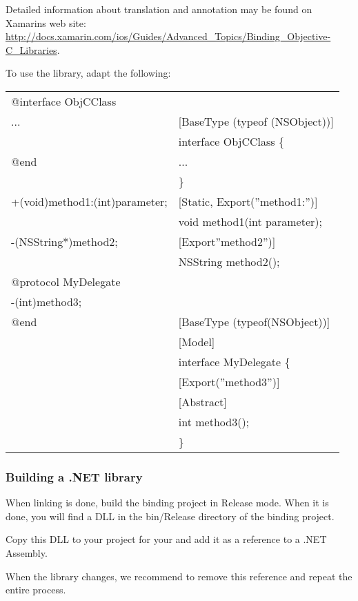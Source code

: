 Detailed information about translation and annotation may be found on Xamarins web site: 
\url{http://docs.xamarin.com/ios/Guides/Advanced\_Topics/Binding\_Objective-C\_Libraries}.

To use the library, adapt the following:

\begin{supertabular}{|p{6.0cm}p{6.0cm}|}
\hline
      @interface ObjCClass\\... 
      & [BaseType (typeof (NSObject))] \\ 
      & interface ObjCClass \{ \\
\hline
      @end & ... \\ 
      & \}\\
\hline
      +(void)method1:(int)parameter; 
      & [Static, Export(''method1:'')] \\ 
     & void method1(int parameter);\\
\hline
      -(NSString$\ast$)method2; 
      & [Export''method2'')] \\ 
      & NSString method2();\\
\hline
      @protocol MyDelegate \\
      -(int)method3; \\ 
       @end 
      & [BaseType (typeof(NSObject))] \\ 
      & [Model] \\
      & interface MyDelegate \{\\ 
      & [Export(''method3'')] \\ 
      & [Abstract] \\ 
      & int method3();\\ 
      & \}\\
\hline
\end{supertabular}

\subsubsection{Building a .NET library}

When linking is done, build the binding project in Release mode. When it is done, you will find a DLL in the bin/Release directory of the binding project.

Copy this DLL to your project for your \gdaut{} and add it as a reference to a .NET Assembly.

When the library changes, we recommend to remove this reference and repeat the entire process.

